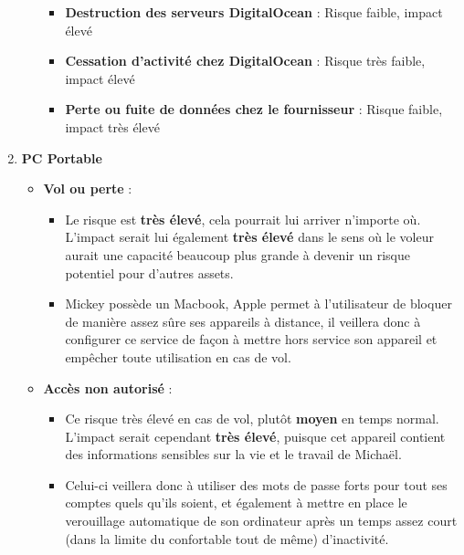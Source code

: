 \documentclass[a4paper,10pt,final,fleqn]{article}
\begin{document}
\begin{enumerate}
\begin{itemize}
								\begin{itemize}
									\item \textbf{Destruction des serveurs DigitalOcean} : Risque faible, impact élevé
									\item \textbf{Cessation d'activité chez DigitalOcean} : Risque très faible, impact élevé
									\item \textbf{Perte ou fuite de données chez le fournisseur} : Risque faible, impact très élevé\\
								\end{itemize}

						\end{itemize}


					\item \textbf{PC Portable}

						\begin{itemize}
							\item \textbf{Vol ou perte} : \\

								\begin{itemize}
									\item Le risque est \textbf{très élevé}, cela pourrait lui arriver n'importe où. L'impact serait lui également \textbf{très élevé} dans le sens où le voleur aurait une capacité beaucoup plus grande à devenir un risque potentiel pour d'autres assets.\\
									\item Mickey possède un Macbook, Apple permet à l'utilisateur de bloquer de manière assez sûre ses appareils à distance, il veillera donc à configurer ce service de façon à mettre hors service son appareil et empêcher toute utilisation en cas de vol.\\
								\end{itemize}
							

							\item \textbf{Accès non autorisé} :  \\

								\begin{itemize}
									\item Ce risque très élevé en cas de vol, plutôt \textbf{moyen} en temps normal.\\ L'impact serait cependant \textbf{très élevé}, puisque cet appareil contient des informations sensibles sur la vie et le travail de Michaël.\\
									\item Celui-ci veillera donc à utiliser des mots de passe forts pour tout ses comptes quels qu'ils soient, et également à mettre en place le verouillage automatique de son ordinateur après un temps assez court (dans la limite du confortable tout de même) d'inactivité.\\
								\end{itemize}							
							

\end{itemize}
\end{enumerate}
\end{document}
